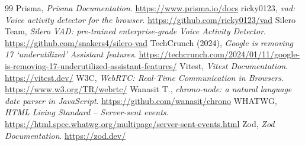 \begin{thebibliography}{99}
 Prisma, \textit{Prisma Documentation}. \url{https://www.prisma.io/docs}
 ricky0123, \textit{vad: Voice activity detector for the browser}. \url{https://github.com/ricky0123/vad}
 Silero Team, \textit{Silero VAD: pre-trained enterprise-grade Voice Activity Detector}. \url{https://github.com/snakers4/silero-vad}
 TechCrunch (2024), \textit{Google is removing 17 `underutilized' Assistant features}. \url{https://techcrunch.com/2024/01/11/google-is-removing-17-underutilized-assistant-features/}
 Vitest, \textit{Vitest Documentation}. \url{https://vitest.dev/}
 W3C, \textit{WebRTC: Real-Time Communication in Browsers}. \url{https://www.w3.org/TR/webrtc/}
 Wanasit T., \textit{chrono-node: a natural language date parser in JavaScript}. \url{https://github.com/wanasit/chrono}
 WHATWG, \textit{HTML Living Standard – Server-sent events}. \url{https://html.spec.whatwg.org/multipage/server-sent-events.html}
 Zod, \textit{Zod Documentation}. \url{https://zod.dev/}
\end{thebibliography}
